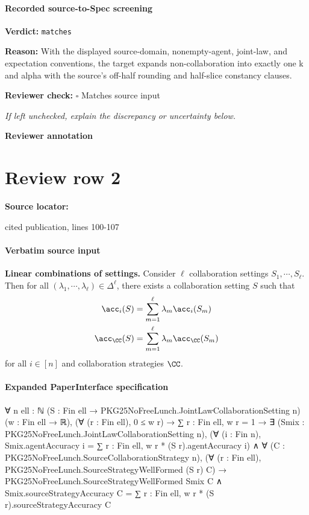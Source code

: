 \documentclass[10pt]{article}
\newcommand{\reviewerbox}{%
  \par\noindent\fbox{\parbox{0.96\linewidth}{\rule{0pt}{0.38in}}}\par
}
\newcommand{\reviewmatch}[1]{%
  \par\noindent\textbf{Reviewer check:} $\square$\; #1\par
  \noindent\emph{If left unchecked, explain the discrepancy or uncertainty below.}\par
}
\begin{document}
\paragraph{Recorded source-to-Spec screening}
\textbf{Verdict:} \texttt{matches}
\\
{\raggedright
\textbf{Reason:} With the displayed source-\allowbreak{}domain, nonempty-\allowbreak{}agent, joint-\allowbreak{}law, and expectation conventions, the target expands non-\allowbreak{}collaboration into exactly one k and alpha with the source's off-\allowbreak{}half rounding and half-\allowbreak{}slice constancy clauses.\allowbreak{}
\par}
\reviewmatch{Matches source input}
\noindent\textbf{Reviewer annotation}\par
\reviewerbox
\clearpage
\hypertarget{source-claim-bee3bb1dc601f6f9}{}
\section*{Review row 2}
\textbf{Source locator:} {\footnotesize\raggedright cited publication, lines 100-\allowbreak{}107\par}
\paragraph{Verbatim source input}
\begin{ReviewVerbatim}
\begin{proposition}\label{prop:linear-combination} \textbf{Linear combinations of settings.}
    Consider $\ell$ collaboration settings $S_1, \cdots, S_\ell$. Then for all $(\lambda_1, \cdots, \lambda_\ell)\in \Delta^\ell$, there exists a collaboration setting $S$ such that
    \begin{align}
        \acc_i(S) &= \sum_{m=1}^\ell \lambda_m \acc_i(S_m)\label{eq:monstera-1}\\
        \acc_\CC(S) &= \sum_{m=1}^\ell \lambda_m \acc_\CC(S_m)\label{eq:monstera-2}
    \end{align}
    for all $i\in [n]$ and collaboration strategies $\CC$.
\end{proposition}
\end{ReviewVerbatim}



\paragraph{Expanded PaperInterface specification}
\begin{ReviewVerbatim}
∀ {n ell : ℕ} (S : Fin ell → PKG25NoFreeLunch.JointLawCollaborationSetting n) (w : Fin ell → ℝ),
  (∀ (r : Fin ell), 0 ≤ w r) →
    ∑ r : Fin ell, w r = 1 →
      ∃ (Smix : PKG25NoFreeLunch.JointLawCollaborationSetting n),
        (∀ (i : Fin n), Smix.agentAccuracy i = ∑ r : Fin ell, w r * (S r).agentAccuracy i) ∧
          ∀ (C : PKG25NoFreeLunch.SourceCollaborationStrategy n),
            (∀ (r : Fin ell), PKG25NoFreeLunch.SourceStrategyWellFormed (S r) C) →
              PKG25NoFreeLunch.SourceStrategyWellFormed Smix C ∧
                Smix.sourceStrategyAccuracy C = ∑ r : Fin ell, w r * (S r).sourceStrategyAccuracy C
\end{ReviewVerbatim}
\end{document}

